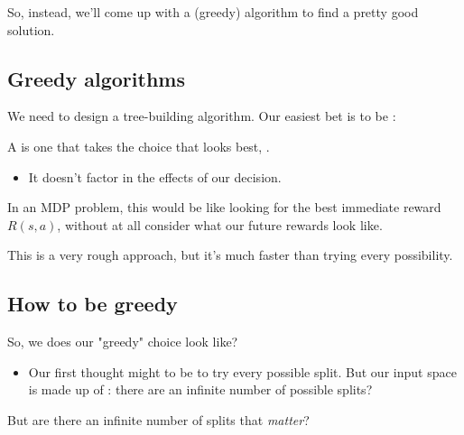         So, instead, we'll come up with a (greedy) algorithm to find a pretty good solution.





    \pagebreak
        

    \subsection{Greedy algorithms}

        We need to design a tree-building algorithm. Our easiest bet is to be :\\

        \begin{definition}
            A  is one that takes the choice that looks best, .

            \begin{itemize}
                \item It doesn't factor in the  effects of our decision.
            \end{itemize}
        \end{definition}

        \miniex In an MDP problem, this would be like looking for the best immediate reward $R(s,a)$, without at all consider what our future rewards look like.

        This is a very rough approach, but it's much faster than trying every possibility.




    \phantom{}

    \subsection{How to be greedy}

        So, we does our "greedy" choice look like? 

        \begin{itemize}
            \item Our first thought might to be to try every possible split. But our input space is made up of : there are an infinite number of possible splits?
        \end{itemize}

        But are there an infinite number of splits that \textit{matter}?

